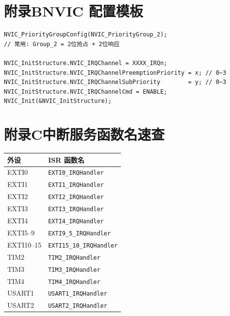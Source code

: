 \documentclass[10pt,a4paper,oneside]{ctexart}
\begin{document}
\section*{附录B\quad NVIC 配置模板}

\begin{codebox}
\begin{lstlisting}[style=stm32, numbers=none]
NVIC_PriorityGroupConfig(NVIC_PriorityGroup_2);
// 常用: Group_2 = 2位抢占 + 2位响应

NVIC_InitStructure.NVIC_IRQChannel = XXXX_IRQn;
NVIC_InitStructure.NVIC_IRQChannelPreemptionPriority = x; // 0~3
NVIC_InitStructure.NVIC_IRQChannelSubPriority        = y; // 0~3
NVIC_InitStructure.NVIC_IRQChannelCmd = ENABLE;
NVIC_Init(&NVIC_InitStructure);
\end{lstlisting}
\end{codebox}

\section*{附录C\quad 中断服务函数名速查}

\begin{center}
\begin{tabular}{@{}ll@{}}
    \toprule
    \textbf{外设} & \textbf{ISR 函数名} \\
    \midrule
    EXTI0 & \texttt{EXTI0\_IRQHandler} \\
    EXTI1 & \texttt{EXTI1\_IRQHandler} \\
    EXTI2 & \texttt{EXTI2\_IRQHandler} \\
    EXTI3 & \texttt{EXTI3\_IRQHandler} \\
    EXTI4 & \texttt{EXTI4\_IRQHandler} \\
    EXTI5--9 & \texttt{EXTI9\_5\_IRQHandler} \\
    EXTI10--15 & \texttt{EXTI15\_10\_IRQHandler} \\
    TIM2 & \texttt{TIM2\_IRQHandler} \\
    TIM3 & \texttt{TIM3\_IRQHandler} \\
    TIM4 & \texttt{TIM4\_IRQHandler} \\
    USART1 & \texttt{USART1\_IRQHandler} \\
    USART2 & \texttt{USART2\_IRQHandler} \\
    \bottomrule
\end{tabular}
\end{center}
\end{document}

